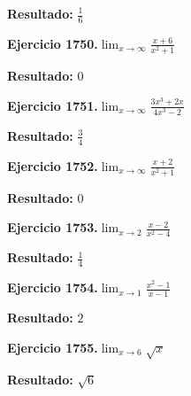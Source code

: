 \documentclass[10pt,a4paper]{article}
\begin{document}
\begin{solbox}
\textbf{Resultado:} \(\displaystyle \frac{1}{6}\)
\end{solbox}

\newpage
\begin{ejbox}
\textbf{Ejercicio 1750.}\quad $\lim_{x\to \infty} \frac{x + 6}{x^2 + 1}$
\end{ejbox}

\begin{solbox}
\textbf{Resultado:} \(\displaystyle 0\)
\end{solbox}

\begin{ejbox}
\textbf{Ejercicio 1751.}\quad $\lim_{x\to \infty} \frac{3x^3 + 2x}{4x^3 - 2}$
\end{ejbox}

\begin{solbox}
\textbf{Resultado:} \(\displaystyle \frac{3}{4}\)
\end{solbox}

\begin{ejbox}
\textbf{Ejercicio 1752.}\quad $\lim_{x\to \infty} \frac{x + 2}{x^2 + 1}$
\end{ejbox}

\begin{solbox}
\textbf{Resultado:} \(\displaystyle 0\)
\end{solbox}

\newpage
\begin{ejbox}
\textbf{Ejercicio 1753.}\quad $\lim_{x\to 2} \frac{x-2}{x^2-4}$
\end{ejbox}

\begin{solbox}
\textbf{Resultado:} \(\displaystyle \frac{1}{4}\)
\end{solbox}

\begin{ejbox}
\textbf{Ejercicio 1754.}\quad $\lim_{x\to 1} \frac{x^2-1}{x-1}$
\end{ejbox}

\begin{solbox}
\textbf{Resultado:} \(\displaystyle 2\)
\end{solbox}

\begin{ejbox}
\textbf{Ejercicio 1755.}\quad $\lim_{x\to 6} \sqrt{x}$
\end{ejbox}

\begin{solbox}
\textbf{Resultado:} \(\displaystyle \sqrt{6}\)
\end{solbox}
\end{document}
